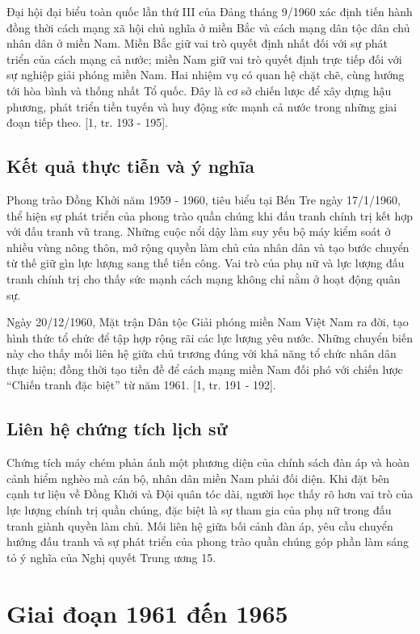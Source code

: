 Đại hội đại biểu toàn quốc lần thứ III của Đảng tháng 9/1960 xác định tiến hành đồng thời cách mạng xã hội chủ nghĩa ở miền Bắc và cách mạng dân tộc dân chủ nhân dân ở miền Nam. Miền Bắc giữ vai trò quyết định nhất đối với sự phát triển của cách mạng cả nước; miền Nam giữ vai trò quyết định trực tiếp đối với sự nghiệp giải phóng miền Nam. Hai nhiệm vụ có quan hệ chặt chẽ, cùng hướng tới hòa bình và thống nhất Tổ quốc. Đây là cơ sở chiến lược để xây dựng hậu phương, phát triển tiền tuyến và huy động sức mạnh cả nước trong những giai đoạn tiếp theo. [1, tr. 193 - 195].

\subsection{Kết quả thực tiễn và ý nghĩa}

Phong trào Đồng Khởi năm 1959 - 1960, tiêu biểu tại Bến Tre ngày 17/1/1960, thể hiện sự phát triển của phong trào quần chúng khi đấu tranh chính trị kết hợp với đấu tranh vũ trang. Những cuộc nổi dậy làm suy yếu bộ máy kiểm soát ở nhiều vùng nông thôn, mở rộng quyền làm chủ của nhân dân và tạo bước chuyển từ thế giữ gìn lực lượng sang thế tiến công. Vai trò của phụ nữ và lực lượng đấu tranh chính trị cho thấy sức mạnh cách mạng không chỉ nằm ở hoạt động quân sự.

Ngày 20/12/1960, Mặt trận Dân tộc Giải phóng miền Nam Việt Nam ra đời, tạo hình thức tổ chức để tập hợp rộng rãi các lực lượng yêu nước. Những chuyển biến này cho thấy mối liên hệ giữa chủ trương đúng với khả năng tổ chức nhân dân thực hiện; đồng thời tạo tiền đề để cách mạng miền Nam đối phó với chiến lược “Chiến tranh đặc biệt” từ năm 1961. [1, tr. 191 - 192].

\subsection{Liên hệ chứng tích lịch sử}

Chứng tích máy chém phản ánh một phương diện của chính sách đàn áp và hoàn cảnh hiểm nghèo mà cán bộ, nhân dân miền Nam phải đối diện. Khi đặt bên cạnh tư liệu về Đồng Khởi và Đội quân tóc dài, người học thấy rõ hơn vai trò của lực lượng chính trị quần chúng, đặc biệt là sự tham gia của phụ nữ trong đấu tranh giành quyền làm chủ. Mối liên hệ giữa bối cảnh đàn áp, yêu cầu chuyển hướng đấu tranh và sự phát triển của phong trào quần chúng góp phần làm sáng tỏ ý nghĩa của Nghị quyết Trung ương 15.

\section{Giai đoạn 1961 đến 1965}

